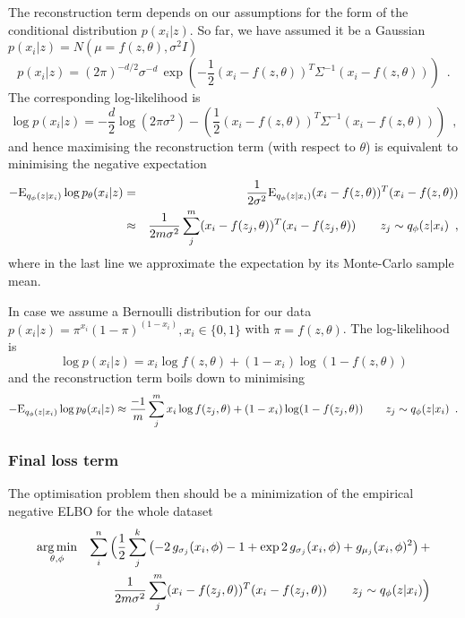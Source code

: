 The reconstruction term depends on our assumptions for the form of the conditional distribution $p(x_i | z)$.
So far, we have assumed it be a Gaussian $p(x_i | z) = N(\mu = f(z, \theta), \sigma^2 I)$
\begin{equation}
  p(x_i| z)  = (2 \pi)^{-d/2} \sigma^{-d} \, \exp\left(-\frac{1}{2} (x_i - f(z, \theta))^T \Sigma^{-1} (x_i - f(z, \theta)) \right) \enspace .
\end{equation}
The corresponding log-likelihood is
\begin{equation}
  \log p(x_i| z)  = - \frac{d}{2} \log (2 \pi \sigma^{2}) - \left(\frac{1}{2} (x_i - f(z, \theta))^T \Sigma^{-1} (x_i - f(z, \theta)) \right) \enspace ,
\end{equation}
and hence maximising the reconstruction term (with respect to $\theta$) is equivalent to minimising the negative expectation
\begin{eqnarray}
 -\mathrm{E}_{q_{\phi}(z|x_i)} \log p_{\theta}(x_i | z) & = & \frac{1}{2 \sigma^2} \mathrm{E}_{q_{\phi}(z|x_i)} (x_i - f(z, \theta))^T (x_i - f(z, \theta)) \nonumber \\
 & \approx & \frac{1}{2m \sigma^2} \sum_j^m (x_i - f(z_j, \theta))^T (x_i - f(z_j, \theta)) \qquad z_j \sim q_{\phi}(z|x_i)
 \enspace ,
\end{eqnarray}
where in the last line we approximate the expectation by its Monte-Carlo sample mean.

In case we assume a Bernoulli distribution for our data
$p(x_i | z) = \pi^{x_i} (1-\pi)^{(1-x_i)}, x_i \in \{0,1\}$ with $\pi = f(z,\theta)$.
The log-likelihood is
\begin{equation}
\log p(x_i | z) = x_i \log f(z,\theta) + (1-x_i) \log (1- f(z,\theta))
\end{equation}
and the reconstruction term boils down to minimising
\begin{equation}
-\mathrm{E}_{q_{\phi}(z|x_i)} \log p_{\theta}(x_i | z) \approx
\frac{-1}{m} \sum_j^m x_i \log f(z_j,\theta) + (1-x_i) \log (1- f(z_j,\theta))  \qquad z_j \sim q_{\phi}(z|x_i)
 \enspace .
\end{equation}

\subsubsection{Final loss term}

The optimisation problem then should be a minimization of the empirical negative ELBO for the whole dataset
\begin{eqnarray}
\operatorname*{arg\,min}_{\theta, \phi} & & \sum_i^n \Big( \frac{1}{2} \sum_j^k \left(- 2 \, g_{\sigma_j}(x_i,\phi) - 1 + \exp 2 \, g_{\sigma_j}(x_i,\phi) + g_{\mu_j}(x_i,\phi)^2 \right) + \nonumber \\
&& \frac{1}{2m \sigma^2} \sum_j^m (x_i - f(z_j, \theta))^T (x_i - f(z_j, \theta)) \qquad z_j \sim q_{\phi}(z|x_i) \Big)
\end{eqnarray}

